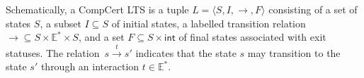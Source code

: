 \documentclass[acmsmall,authordraft]{acmart}
\newcommand{\kw}[1]{\ensuremath{ \mathsf{#1} }}
\begin{document}
Schematically, a CompCert LTS
is a tuple
$L = \langle S, I, {\rightarrow}, F \rangle$
consisting of
a set of states $S$,
a subset $I \subseteq S$ of initial states,
a labelled transition relation
${\rightarrow} \subseteq S \times \mathbb{E}^* \times S$,
and a set
$F \subseteq S \times \kw{int}$
of final states associated with exit statuses.
The relation~$s \stackrel{t}{\rightarrow} s'$
indicates that the state $s$ may transition to the state $s'$
through an interaction $t \in \mathbb{E}^*$.
\end{document}
